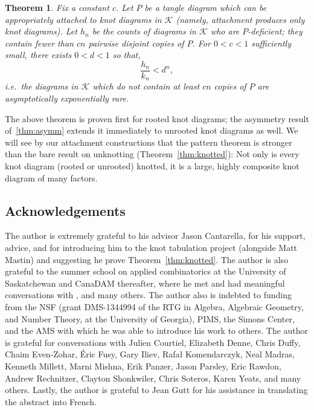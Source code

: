 \documentclass[submission%
]{dmtcs}
\newcommand{\KnotDiaClass}{\mathscr{K}}
\newcommand{\KnotDiaCard}{k}
\newtheorem{theorem}{Theorem}
\begin{document}
\begin{theorem}
  \label{thm:pattern}
  Fix a constant $c$. Let $P$ be a tangle diagram which can be
  appropriately attached to knot diagrams in $\KnotDiaClass$ (namely,
  attachment produces only knot diagrams). Let $h_n$ be the counts of
  diagrams in $\KnotDiaClass$ who are \emph{$P$-deficient}; they
  contain fewer than $cn$ pairwise disjoint copies of $P$. For $0 < c
  < 1$ sufficiently small, there exists $0 < d < 1$ so that,
  \begin{displaymath}
    \frac{h_n}{\KnotDiaCard_n} < d^n,
  \end{displaymath}
  \textit{i.e.}\ the diagrams in $\KnotDiaClass$ which do not contain at least
  $cn$ copies of $P$ are asymptotically exponentially rare.
\end{theorem}

The above theorem is proven first for rooted knot diagrams; the
asymmetry result of~\ref{thm:asymm} extends it immediately to unrooted
knot diagrams as well. We will see by our attachment constructions
that the pattern theorem is stronger than the bare result on
unknotting (Theorem~\ref{thm:knotted}): Not only is every knot diagram
(rooted or unrooted) knotted, it is a large, highly composite knot
diagram of many factors.

\subsection{Acknowledgements}
\label{sec:acknowledgements}

The author is extremely grateful to his advisor Jason Cantarella, for
his support, advice, and for introducing him to the knot tabulation project
(alongside Matt Mastin) and suggesting he prove
Theorem~\ref{thm:knotted}. The author is also grateful to the summer
school on applied combinatorics at the University of Saskatchewan and
CanaDAM thereafter, where he met and had meaningful conversations with
, and many others. The author also is indebted to funding from the NSF
(grant DMS-1344994 of the RTG in Algebra, Algebraic Geometry, and
Number Theory, at the University of Georgia), PIMS, the Simons Center,
and the AMS with which he was able to introduce his work to
others. The author is grateful for conversations with Julien Courtiel,
Elizabeth Denne, Chris Duffy, Chaim Even-Zohar, \'Eric Fusy, Gary
Iliev, Rafa\l{} Komendarczyk, Neal Madras, Kenneth Millett, Marni
Mishna, Erik Panzer, Jason Parsley, Eric Rawdon, Andrew Rechnitzer,
Clayton Shonkwiler, Chris Soteros, Karen Yeats, and many
others. Lastly, the author is grateful to Jean Gutt for his assistance
in translating the abstract into French.
\end{document}
